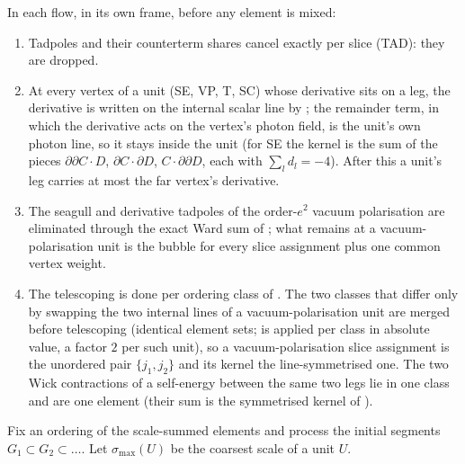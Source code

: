 \begin{definition}\label{rot:h1s:rule}
In each flow, in its own frame, before any element is mixed:
\begin{enumerate}[label=\textup{(NF\arabic*)},leftmargin=*]
\item Tadpoles and their counterterm shares cancel exactly per slice (TAD): they are dropped.
\item At every vertex of a unit (SE, VP, T, SC) whose derivative sits on a leg, the derivative is written on the internal scalar line by ; the remainder term, in which the derivative acts on the vertex's photon field, is the unit's own photon line, so it stays inside the unit (for SE the kernel is the sum of the pieces $\partial\partial C\cdot D$, $\partial C\cdot\partial D$, $C\cdot\partial\partial D$, each with $\sum_ld_l=-4$). After this a unit's leg carries at most the far vertex's derivative.
\item The seagull and derivative tadpoles of the order-$e^2$ vacuum polarisation are eliminated through the exact Ward sum of ; what remains at a vacuum-polarisation unit is the bubble for every slice assignment plus one common vertex weight.
\item The telescoping is done per ordering class of \cite[(2.7)]{Ba3}. The two classes that differ only by swapping the two internal lines of a vacuum-polarisation unit are merged before telescoping (identical element sets;  is applied per class in absolute value, a factor $2$ per such unit), so a vacuum-polarisation slice assignment is the unordered pair $\{j_1,j_2\}$ and its kernel the line-symmetrised one. The two Wick contractions of a self-energy between the same two legs lie in one class and are one element (their sum is the symmetrised kernel of ).
\end{enumerate}
Fix an ordering of the scale-summed elements and process the initial segments $G_1\subset G_2\subset\dots$. Let $\sigma_{\max}(U)$ be the coarsest scale of a unit $U$.
\begin{enumerate}[label=\textup{(R\arabic*)},leftmargin=*]

\end{enumerate}
\end{definition}

